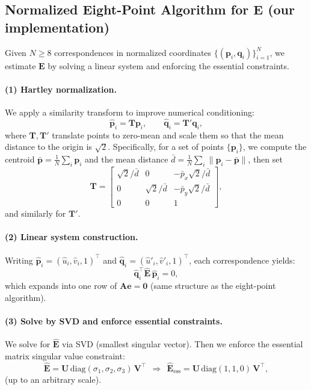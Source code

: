 \documentclass{article}
\begin{document}
\subsection{Normalized Eight-Point Algorithm for $\mathbf{E}$ (our implementation)}
Given $N\ge 8$ correspondences in normalized coordinates $\{(\mathbf{p}_i,\mathbf{q}_i)\}_{i=1}^N$,
we estimate $\mathbf{E}$ by solving a linear system and enforcing the essential constraints.

\paragraph{(1) Hartley normalization.}
We apply a similarity transform to improve numerical conditioning:
\[
\hat{\mathbf{p}}_i = \mathbf{T}\mathbf{p}_i,\qquad \hat{\mathbf{q}}_i = \mathbf{T}'\mathbf{q}_i,
\]
where $\mathbf{T},\mathbf{T}'$ translate points to zero-mean and scale them so that the mean distance to the origin is $\sqrt{2}$.
Specifically, for a set of points $\{\mathbf{p}_i\}$, we compute the centroid $\bar{\mathbf{p}}=\frac{1}{N}\sum_i \mathbf{p}_i$ and the mean distance $\bar{d}=\frac{1}{N}\sum_i \|\mathbf{p}_i - \bar{\mathbf{p}}\|$, then set
\[
\mathbf{T} = \begin{bmatrix} \sqrt{2}/\bar{d} & 0 & -\bar{p}_x\sqrt{2}/\bar{d} \\ 0 & \sqrt{2}/\bar{d} & -\bar{p}_y\sqrt{2}/\bar{d} \\ 0 & 0 & 1 \end{bmatrix},
\]
and similarly for $\mathbf{T}'$.

\paragraph{(2) Linear system construction.}
Writing $\hat{\mathbf{p}}_i=(\hat{u}_i,\hat{v}_i,1)^\top$ and $\hat{\mathbf{q}}_i=(\hat{u}'_i,\hat{v}'_i,1)^\top$,
each correspondence yields:
\[
\hat{\mathbf{q}}_i^\top \hat{\mathbf{E}}\,\hat{\mathbf{p}}_i=0,
\]
which expands into one row of $\mathbf{A}\mathbf{e}=\mathbf{0}$ (same structure as the eight-point algorithm).

\paragraph{(3) Solve by SVD and enforce essential constraints.}
We solve for $\hat{\mathbf{E}}$ via SVD (smallest singular vector).
Then we enforce the essential matrix singular value constraint:
\[
\hat{\mathbf{E}}=\mathbf{U}\,\mathrm{diag}(\sigma_1,\sigma_2,\sigma_3)\,\mathbf{V}^\top
\ \ \Rightarrow\ \ 
\hat{\mathbf{E}}_{\text{ess}}=\mathbf{U}\,\mathrm{diag}(1,1,0)\,\mathbf{V}^\top,
\]
(up to an arbitrary scale).
\end{document}
